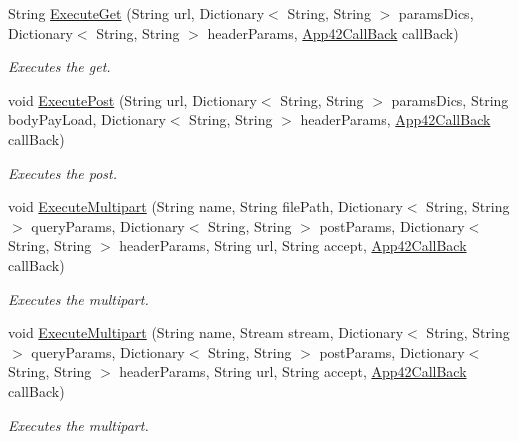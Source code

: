 \begin{DoxyCompactItemize}
\item 
String \hyperlink{classcom_1_1shephertz_1_1app42_1_1paas_1_1sdk_1_1csharp_1_1connection_1_1_r_e_s_t_connector_w_w_w_a4dea9c166a2f7eef23daadf1f2e4b25e}{Execute\+Get} (String url, Dictionary$<$ String, String $>$ params\+Dics, Dictionary$<$ String, String $>$ header\+Params, \hyperlink{interfacecom_1_1shephertz_1_1app42_1_1paas_1_1sdk_1_1csharp_1_1_app42_call_back}{App42\+Call\+Back} call\+Back)
\begin{DoxyCompactList}\small\item\em Executes the get. \end{DoxyCompactList}\item 
void \hyperlink{classcom_1_1shephertz_1_1app42_1_1paas_1_1sdk_1_1csharp_1_1connection_1_1_r_e_s_t_connector_w_w_w_a1b2a4f43e9c18782a39e1f6f4b7500c2}{Execute\+Post} (String url, Dictionary$<$ String, String $>$ params\+Dics, String body\+Pay\+Load, Dictionary$<$ String, String $>$ header\+Params, \hyperlink{interfacecom_1_1shephertz_1_1app42_1_1paas_1_1sdk_1_1csharp_1_1_app42_call_back}{App42\+Call\+Back} call\+Back)
\begin{DoxyCompactList}\small\item\em Executes the post. \end{DoxyCompactList}\item 
void \hyperlink{classcom_1_1shephertz_1_1app42_1_1paas_1_1sdk_1_1csharp_1_1connection_1_1_r_e_s_t_connector_w_w_w_ab75d6210d4369786acea2e0c37ba87ce}{Execute\+Multipart} (String name, String file\+Path, Dictionary$<$ String, String $>$ query\+Params, Dictionary$<$ String, String $>$ post\+Params, Dictionary$<$ String, String $>$ header\+Params, String url, String accept, \hyperlink{interfacecom_1_1shephertz_1_1app42_1_1paas_1_1sdk_1_1csharp_1_1_app42_call_back}{App42\+Call\+Back} call\+Back)
\begin{DoxyCompactList}\small\item\em Executes the multipart. \end{DoxyCompactList}\item 
void \hyperlink{classcom_1_1shephertz_1_1app42_1_1paas_1_1sdk_1_1csharp_1_1connection_1_1_r_e_s_t_connector_w_w_w_a020ceb7b8d2c1cce789a0227e02af22b}{Execute\+Multipart} (String name, Stream stream, Dictionary$<$ String, String $>$ query\+Params, Dictionary$<$ String, String $>$ post\+Params, Dictionary$<$ String, String $>$ header\+Params, String url, String accept, \hyperlink{interfacecom_1_1shephertz_1_1app42_1_1paas_1_1sdk_1_1csharp_1_1_app42_call_back}{App42\+Call\+Back} call\+Back)
\begin{DoxyCompactList}\small\item\em Executes the multipart. \end{DoxyCompactList}\item 

\end{DoxyCompactItemize}
